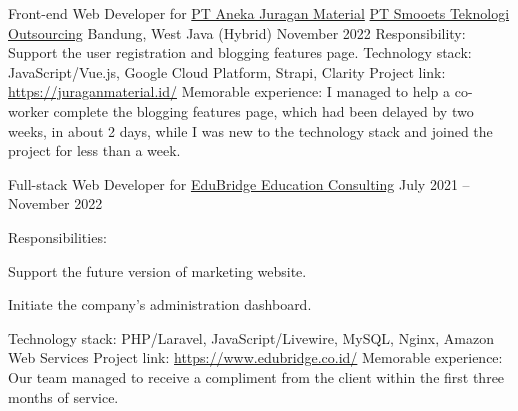\begin{cventries}

\cventry
{Front-end Web Developer for \href{https://juraganmaterial.id/}{PT Aneka Juragan Material}} %
{\href{https://www.smooets.com/}{PT Smooets Teknologi Outsourcing}} %
{Bandung, West Java (Hybrid)} %
{November 2022} %
{ %
Responsibility: Support the user registration and blogging features page.
\linebreak
Technology stack: JavaScript/Vue.js, Google Cloud Platform, Strapi, Clarity
\linebreak
Project link: \href{https://juraganmaterial.id/}{https://juraganmaterial.id/}
\linebreak
Memorable experience: I managed to help a co-worker complete the blogging features page, which had been delayed by two weeks, in about 2 days, while I was new to the technology stack and joined the project for less than a week.
}


\cventry
{Full-stack Web Developer for \href{https://www.edubridge.co.id/}{EduBridge Education Consulting}} %
{} %
{} %
{July 2021 -- November 2022} %
{ %
Responsibilities:
\vspace{5mm}
\begin{cvitems}
\item {Support the future version of marketing website.}
\item {Initiate the company's administration dashboard.}
\end{cvitems}
\vspace{4mm}
Technology stack: PHP/Laravel, JavaScript/Livewire, MySQL, Nginx, Amazon Web Services
\linebreak
Project link: \href{https://www.edubridge.co.id/}{https://www.edubridge.co.id/}
\linebreak
Memorable experience: Our team managed to receive a compliment from the client within the first three months of service.
}




\end{cventries}
